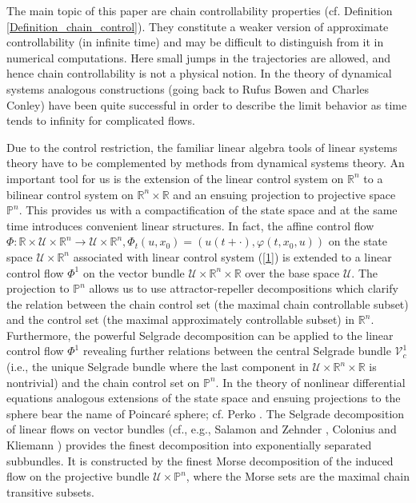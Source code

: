\documentclass{siamltex}%
\begin{document}
The main topic of this paper are chain controllability properties (cf.
Definition \ref{Definition_chain_control}). They constitute a weaker version
of approximate controllability (in infinite time) and may be difficult to
distinguish from it in numerical computations. Here small jumps in the
trajectories are allowed, and hence chain controllability is not a physical
notion. In the theory of dynamical systems analogous constructions (going back
to Rufus Bowen and Charles Conley) have been quite successful in order to
describe the limit behavior as time tends to infinity for complicated flows.

Due to the control restriction, the familiar linear algebra tools of linear
systems theory have to be complemented by methods from dynamical systems
theory. An important tool for us is the extension of the linear control system
on $\mathbb{R}^{n}$ to a bilinear control system on $\mathbb{R}^{n}%
\times\mathbb{R}$ and an ensuing projection to projective space $\mathbb{P}%
^{n}$. This provides us with a compactification of the state space and at the
same time introduces convenient linear structures. In fact, the affine control
flow $\Phi:\mathbb{R}\times\mathcal{U}\times\mathbb{R}^{n}\rightarrow
\mathcal{U}\times\mathbb{R}^{n},\Phi_{t}(u,x_{0})=(u(t+\cdot),\varphi
(t,x_{0},u))$ on the state space $\mathcal{U}\times\mathbb{R}^{n}$ associated
with linear control system (\ref{1}) is extended to a linear control flow
$\Phi^{1}$ on the vector bundle $\mathcal{U}\times\mathbb{R}^{n}%
\times\mathbb{R}$ over the base space $\mathcal{U}$. The projection to
$\mathbb{P}^{n}$ allows us to use attractor-repeller decompositions which
clarify the relation between the chain control set (the maximal chain
controllable subset) and the control set (the maximal approximately
controllable subset) in $\mathbb{R}^{n}$. Furthermore, the powerful Selgrade
decomposition can be applied to the linear control flow $\Phi^{1}$ revealing
further relations between the central Selgrade bundle $\mathcal{V}_{c}^{1}$
(i.e., the unique Selgrade bundle where the last component in $\mathcal{U}%
\times\mathbb{R}^{n}\times\mathbb{R}$ is nontrivial) and the chain control set
on $\mathbb{P}^{n}$. In the theory of nonlinear differential equations
analogous extensions of the state space and ensuing projections to the sphere
bear the name of Poincar\'{e} sphere; cf. Perko \cite{Perko}. The Selgrade
decomposition of linear flows on vector bundles (cf., e.g., Salamon and
Zehnder \cite{SalZ88}, Colonius and Kliemann \cite[Theorem 5.2.5]{ColK00})
provides the finest decomposition into exponentially separated subbundles. It
is constructed by the finest Morse decomposition of the induced flow on the
projective bundle $\mathcal{U}\times\mathbb{P}^{n}$, where the Morse sets are
the maximal chain transitive subsets.
\end{document}
